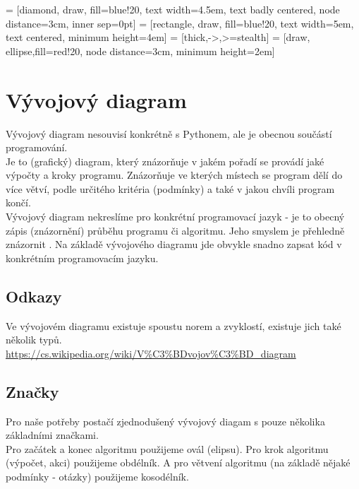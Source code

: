  = [diamond, draw, fill=blue!20, 
    text width=4.5em, text badly centered, node distance=3cm, inner sep=0pt]
 = [rectangle, draw, fill=blue!20, 
    text width=5em, text centered, minimum height=4em]
 = [thick,->,>=stealth]
 = [draw, ellipse,fill=red!20, node distance=3cm,
    minimum height=2em]

\section{Vývojový diagram}
Vývojový diagram nesouvisí konkrétně s Pythonem, ale je obecnou součástí programování.\\
Je to (grafický) diagram, který znázorňuje v jakém pořadí se provádí jaké výpočty a kroky programu. Znázorňuje ve kterých místech se program dělí do více větví, podle určitého kritéria (podmínky) a také v jakou chvíli program končí.\\
Vývojový diagram nekreslíme pro konkrétní programovací jazyk - je to obecný zápis (znázornění) průběhu programu či algoritmu. Jeho smyslem je přehledně znázornit . Na základě vývojového diagramu jde obvykle snadno zapsat kód v konkrétním programovacím jazyku.\\

\subsection{Odkazy}
Ve vývojovém diagramu existuje spoustu norem a zvyklostí, existuje jich také několik typů.\\
\url{https://cs.wikipedia.org/wiki/V%C3%BDvojov%C3%BD_diagram}

\subsection{Značky}
Pro naše potřeby postačí zjednodušený vývojový diagam s pouze několika základními značkami.\\
Pro začátek a konec algoritmu použijeme ovál (elipsu). Pro krok algoritmu (výpočet, akci) použijeme obdélník. A pro větvení algoritmu (na základě nějaké podmínky - otázky) použijeme kosodélník.

